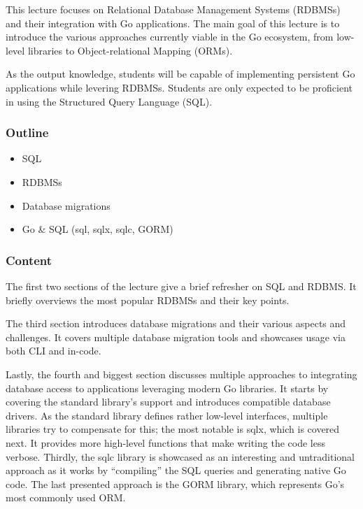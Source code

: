 \documentclass[
  digital,
  color,
  oneside,
  nosansbold,
  nocolorbold,
  nolof,
  nolot,
]{fithesis4}
\begin{document}
This lecture focuses on Relational Database Management Systems (RDBMSs) and their integration with Go applications. The main goal of this lecture is to introduce the various approaches currently viable in the Go ecosystem, from low-level libraries to Object-relational Mapping (ORMs).

As the output knowledge, students will be capable of implementing persistent Go applications while levering RDBMSs. Students are only expected to be proficient in using the Structured Query Language (SQL).

\subsubsection{Outline}

\begin{itemize}
    \item SQL
    \item RDBMSs
    \item Database migrations
    \item Go \& SQL (sql, sqlx, sqlc, GORM)
\end{itemize}

\subsubsection{Content}

The first two sections of the lecture give a brief refresher on SQL and RDBMS. It briefly overviews the most popular RDBMSs and their key points.

The third section introduces database migrations and their various aspects and challenges. It covers multiple database migration tools and showcases usage via both CLI and in-code.

Lastly, the fourth and biggest section discusses multiple approaches to integrating database access to applications leveraging modern Go libraries. It starts by covering the
standard library's support and introduces compatible database drivers. As the standard library defines rather low-level interfaces, multiple libraries try to compensate for this; the most notable is sqlx\cite{sqlx}, which is covered next. It provides more high-level functions that make writing the code less verbose. Thirdly, the sqlc\cite{sqlc} library is showcased as an interesting and untraditional approach as it works by \enquote{compiling} the SQL queries and generating native Go code. The last presented approach is the GORM\cite{gorm} library, which represents Go's most commonly used ORM.
\end{document}
